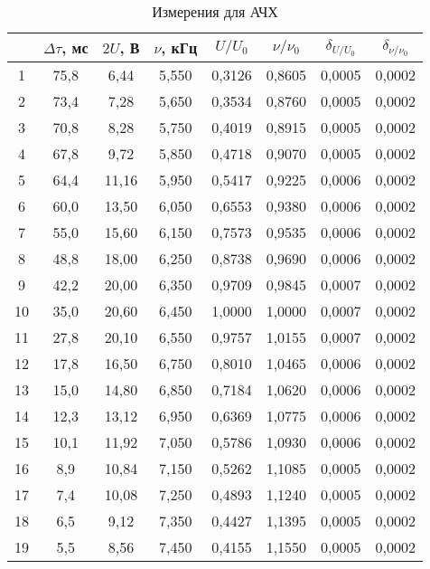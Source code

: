 \begin{table}
\centering
\caption{Измерения для АЧХ}
\begin{tabular}{|c|c|c|c|c|c|c|c|}
\hline
 & $\Delta\tau$, мс & $2U$, В & $\nu$, кГц & $U/U_0$ & $\nu/\nu_0$ & $\delta_{U/U_0}$ & $\delta_{\nu/\nu_0}$ \\
\hline
1 & 75,8 & 6,44 & 5,550 & 0,3126 & 0,8605 & 0,0005 & 0,0002 \\
\cline{1-8}
2 & 73,4 & 7,28 & 5,650 & 0,3534 & 0,8760 & 0,0005 & 0,0002 \\
\cline{1-8}
3 & 70,8 & 8,28 & 5,750 & 0,4019 & 0,8915 & 0,0005 & 0,0002 \\
\cline{1-8}
4 & 67,8 & 9,72 & 5,850 & 0,4718 & 0,9070 & 0,0005 & 0,0002 \\
\cline{1-8}
5 & 64,4 & 11,16 & 5,950 & 0,5417 & 0,9225 & 0,0006 & 0,0002 \\
\cline{1-8}
6 & 60,0 & 13,50 & 6,050 & 0,6553 & 0,9380 & 0,0006 & 0,0002 \\
\cline{1-8}
7 & 55,0 & 15,60 & 6,150 & 0,7573 & 0,9535 & 0,0006 & 0,0002 \\
\cline{1-8}
8 & 48,8 & 18,00 & 6,250 & 0,8738 & 0,9690 & 0,0006 & 0,0002 \\
\cline{1-8}
9 & 42,2 & 20,00 & 6,350 & 0,9709 & 0,9845 & 0,0007 & 0,0002 \\
\cline{1-8}
10 & 35,0 & 20,60 & 6,450 & 1,0000 & 1,0000 & 0,0007 & 0,0002 \\
\cline{1-8}
11 & 27,8 & 20,10 & 6,550 & 0,9757 & 1,0155 & 0,0007 & 0,0002 \\
\cline{1-8}
12 & 17,8 & 16,50 & 6,750 & 0,8010 & 1,0465 & 0,0006 & 0,0002 \\
\cline{1-8}
13 & 15,0 & 14,80 & 6,850 & 0,7184 & 1,0620 & 0,0006 & 0,0002 \\
\cline{1-8}
14 & 12,3 & 13,12 & 6,950 & 0,6369 & 1,0775 & 0,0006 & 0,0002 \\
\cline{1-8}
15 & 10,1 & 11,92 & 7,050 & 0,5786 & 1,0930 & 0,0006 & 0,0002 \\
\cline{1-8}
16 & 8,9 & 10,84 & 7,150 & 0,5262 & 1,1085 & 0,0005 & 0,0002 \\
\cline{1-8}
17 & 7,4 & 10,08 & 7,250 & 0,4893 & 1,1240 & 0,0005 & 0,0002 \\
\cline{1-8}
18 & 6,5 & 9,12 & 7,350 & 0,4427 & 1,1395 & 0,0005 & 0,0002 \\
\cline{1-8}
19 & 5,5 & 8,56 & 7,450 & 0,4155 & 1,1550 & 0,0005 & 0,0002 \\
\cline{1-8}
\hline
\end{tabular}
\end{table}

